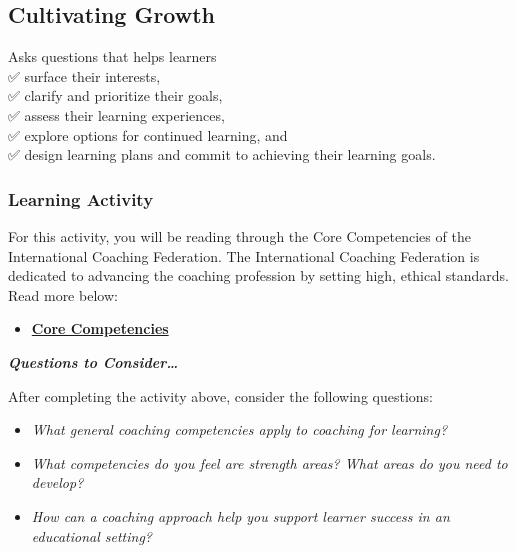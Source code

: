 \documentclass[
]{book}
\providecommand{\tightlist}{%
  \setlength{\itemsep}{0pt}\setlength{\parskip}{0pt}}
\begin{document}
\hypertarget{cultivating-growth}{%
\subsection*{Cultivating Growth}\label{cultivating-growth}}

Asks questions that helps learners\\
✅ surface their interests,\\
✅ clarify and prioritize their goals,\\
✅ assess their learning experiences,\\
✅ explore options for continued learning, and\\
✅ design learning plans and commit to achieving their learning goals.

\begin{reflect}
\hypertarget{learning-activity-12}{%
\subsubsection*{Learning Activity}\label{learning-activity-12}}

For this activity, you will be reading through the Core Competencies of the International Coaching Federation. The International Coaching Federation is dedicated to advancing the coaching profession by setting high, ethical standards. Read more below:

\begin{itemize}
\tightlist
\item
  \href{https://coachfederation.org/core-competencies}{\textbf{Core Competencies}}
\end{itemize}

\textbf{\emph{Questions to Consider\ldots{}}}

After completing the activity above, consider the following questions:

\begin{itemize}
\tightlist
\item
  \emph{What general coaching competencies apply to coaching for learning?}
\item
  \emph{What competencies do you feel are strength areas? What areas do you need to develop?}
\item
  \emph{How can a coaching approach help you support learner success in an educational setting?}
\end{itemize}
\end{reflect}
\end{document}
